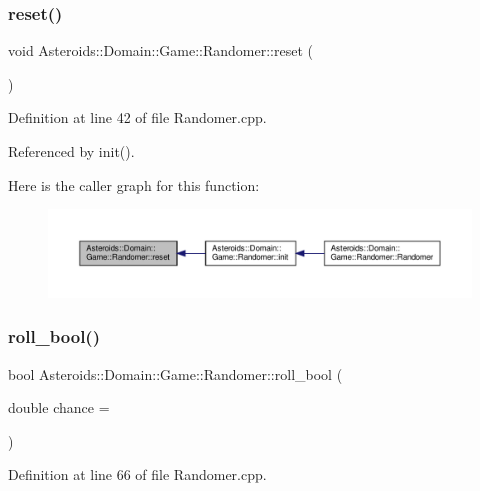 \subsubsection{\texorpdfstring{reset()}{reset()}}
{\footnotesize\ttfamily void Asteroids\+::\+Domain\+::\+Game\+::\+Randomer\+::reset (\begin{DoxyParamCaption}{ }\end{DoxyParamCaption})}



Definition at line 42 of file Randomer.\+cpp.



Referenced by init().

Here is the caller graph for this function\+:\nopagebreak
\begin{figure}[H]
\begin{center}
\leavevmode
\includegraphics[width=350pt]{classAsteroids_1_1Domain_1_1Game_1_1Randomer_af57f0a4d202d7d2b314964231bf5c5b3_icgraph}
\end{center}
\end{figure}
\mbox{\label{classAsteroids_1_1Domain_1_1Game_1_1Randomer_a9d5a2a8aeb43ade5f1a0a9a212f4dd4a}} 
\subsubsection{\texorpdfstring{roll\+\_\+bool()}{roll\_bool()}}
{\footnotesize\ttfamily bool Asteroids\+::\+Domain\+::\+Game\+::\+Randomer\+::roll\+\_\+bool (\begin{DoxyParamCaption}\item[{double}]{chance = {} }\end{DoxyParamCaption})}



Definition at line 66 of file Randomer.\+cpp.



